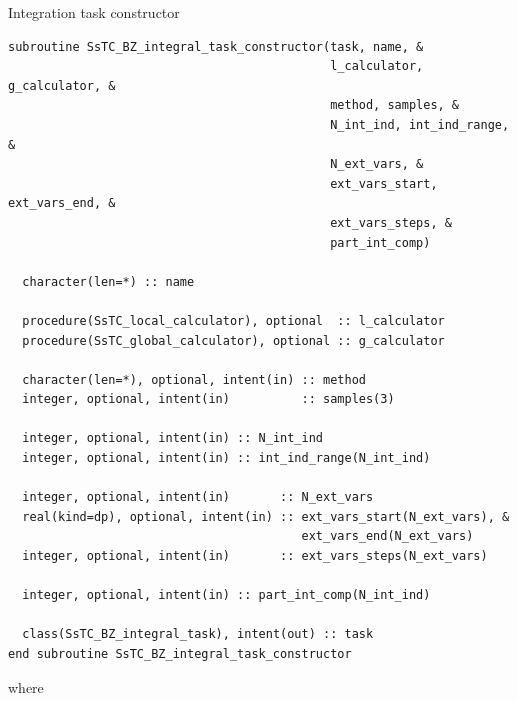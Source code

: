 \documentclass[10pt,a4paper]{article}
\begin{document}
\begin{codebox}{Integration task constructor}
\begin{lstlisting}[caption={Interface of the ``integrator" constructor.},captionpos=b]
subroutine SsTC_BZ_integral_task_constructor(task, name, &
                                             l_calculator, g_calculator, &
                                             method, samples, &
                                             N_int_ind, int_ind_range, &
                                             N_ext_vars, &
                                             ext_vars_start, ext_vars_end, &
                                             ext_vars_steps, &
                                             part_int_comp)

  character(len=*) :: name

  procedure(SsTC_local_calculator), optional  :: l_calculator
  procedure(SsTC_global_calculator), optional :: g_calculator

  character(len=*), optional, intent(in) :: method
  integer, optional, intent(in)          :: samples(3)

  integer, optional, intent(in) :: N_int_ind
  integer, optional, intent(in) :: int_ind_range(N_int_ind)

  integer, optional, intent(in)       :: N_ext_vars
  real(kind=dp), optional, intent(in) :: ext_vars_start(N_ext_vars), &
                                         ext_vars_end(N_ext_vars)
  integer, optional, intent(in)       :: ext_vars_steps(N_ext_vars)

  integer, optional, intent(in) :: part_int_comp(N_int_ind)

  class(SsTC_BZ_integral_task), intent(out) :: task
end subroutine SsTC_BZ_integral_task_constructor
\end{lstlisting}
\end{codebox}
where
\end{document}
